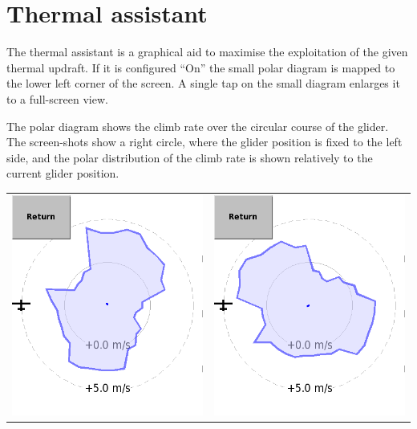 \section{Thermal assistant}\label{sec:thermal-assistant}

The thermal assistant is a graphical aid to maximise the exploitation of the
given thermal updraft. If it is configured ``On''  the
small polar diagram is mapped to the lower left corner of the screen. A
single tap on the small diagram enlarges it to a full-screen view. 

The polar diagram shows the climb rate over the circular course of the glider.
The screen-shots show a right circle, where the glider position is fixed to the
left side, and the polar distribution of the climb rate is shown relatively to
the current glider position.


\begin{tabular}{c c}
\includegraphics[angle=0,width=0.5\linewidth,keepaspectratio='true']{figures/dialog-thermal-assistant0.png}&
\includegraphics[angle=0,width=0.5\linewidth,keepaspectratio='true']{figures/dialog-thermal-assistant1.png}\\
\end{tabular}

